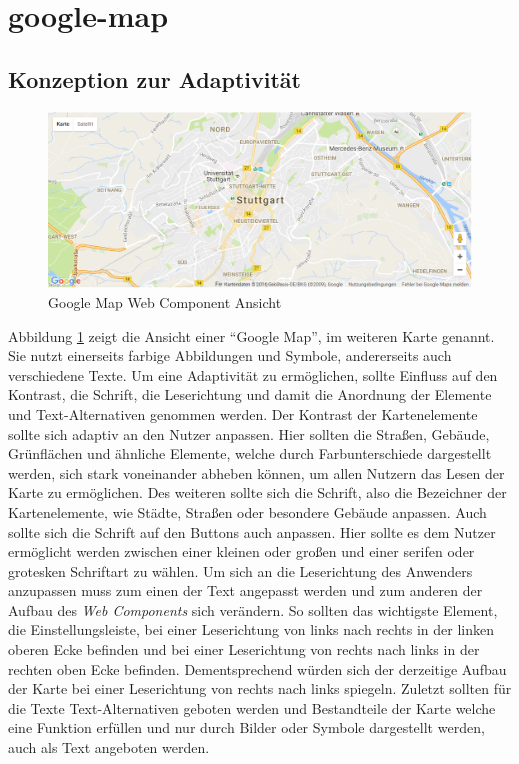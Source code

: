 \documentclass[12pt, paper=a4, bibtotoc, toc=listof, headsepline=true]{scrreprt}
\begin{document}
		\section{google-map}
			\subsection{Konzeption zur Adaptivität}
			\label{ref:konVonAda}
			\begin{figure}
				\centering
				\includegraphics[width=\textwidth,height=\textheight,keepaspectratio]{gmap.png}
				\caption{Google Map Web Component Ansicht}
				\label{img:gmap}
			\end{figure}
			Abbildung \ref{img:gmap} zeigt die Ansicht einer \enquote{Google Map}, im weiteren Karte genannt. Sie nutzt einerseits farbige Abbildungen und Symbole, andererseits auch verschiedene Texte. Um eine Adaptivität zu ermöglichen, sollte Einfluss auf den Kontrast, die Schrift, die Leserichtung und damit die Anordnung der Elemente und Text-Alternativen genommen werden. Der Kontrast der Kartenelemente sollte sich adaptiv an den Nutzer anpassen. Hier sollten die Straßen, Gebäude, Grünflächen und ähnliche Elemente, welche durch Farbunterschiede dargestellt werden, sich stark voneinander abheben können, um allen Nutzern das Lesen der Karte zu ermöglichen. Des weiteren sollte sich die Schrift, also die Bezeichner der Kartenelemente, wie Städte, Straßen oder besondere Gebäude anpassen. Auch sollte sich die Schrift auf den Buttons auch anpassen. Hier sollte es dem Nutzer ermöglicht werden zwischen einer kleinen oder großen und einer serifen oder grotesken Schriftart zu wählen. Um sich an die Leserichtung des Anwenders anzupassen muss zum einen der Text angepasst werden und zum anderen der Aufbau des \emph{Web Components} sich verändern. So sollten das wichtigste Element, die Einstellungsleiste, bei einer Leserichtung von links nach rechts in der linken oberen Ecke befinden und bei einer Leserichtung von rechts nach links in der rechten oben Ecke befinden. Dementsprechend würden sich der derzeitige Aufbau der Karte bei einer Leserichtung von rechts nach links spiegeln. Zuletzt sollten für die Texte Text-Alternativen geboten werden und Bestandteile der Karte welche eine Funktion erfüllen und nur durch Bilder oder Symbole dargestellt werden, auch als Text angeboten werden. 
\end{document}
